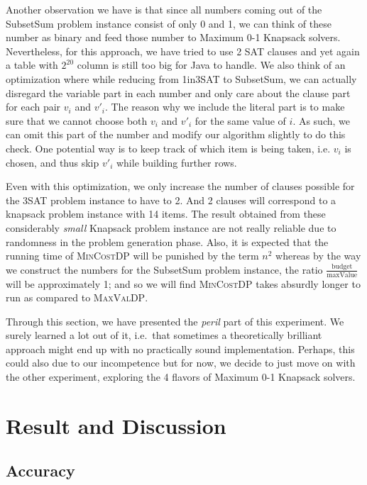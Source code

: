 \documentclass[12pt, oneside]{book}
\begin{document}
Another observation we have is that since all numbers coming out of the
SubsetSum problem instance consist of only 0 and 1, we can think of
these number as binary and feed those number to Maximum 0-1 Knapsack
solvers. Nevertheless, for this approach, we have tried to use 2 SAT
clauses and yet again a table with \(2^{20}\) column is still too big
for Java to handle. We also think of an optimization where while
reducing from 1in3SAT to SubsetSum, we can actually disregard the
variable part in each number and only care about the clause part for
each pair \(v_i\) and \(v'_i\). The reason why we include the literal
part is to make sure that we cannot choose both \(v_i\) and \(v'_i\) for
the same value of \(i\). As such, we can omit this part of the number
and modify our algorithm slightly to do this check. One potential way is
to keep track of which item is being taken, i.e. \(v_i\) is chosen, and
thus skip \(v'_i\) while building further rows.

Even with this optimization, we only increase the number of clauses
possible for the 3SAT problem instance to have to 2. And 2 clauses will
correspond to a knapsack problem instance with 14 items. The result
obtained from these considerably \emph{small} Knapsack problem instance
are not really reliable due to randomness in the problem generation
phase. Also, it is expected that the running time of \textsc{MinCostDP}
will be punished by the term \(n^2\) whereas by the way we construct the
numbers for the SubsetSum problem instance, the ratio
\(\frac{\text{budget}}{\text{maxValue}}\) will be approximately 1; and
so we will find \textsc{MinCostDP} takes absurdly longer to run as
compared to \textsc{MaxValDP}.

Through this section, we have presented the \emph{peril} part of this
experiment. We surely learned a lot out of it, i.e.~that sometimes a
theoretically brilliant approach might end up with no practically sound
implementation. Perhaps, this could also due to our incompetence but for
now, we decide to just move on with the other experiment, exploring the
4 flavors of Maximum 0-1 Knapsack solvers.

\chapter{Result and Discussion}\label{resdis}

\section{Accuracy}\label{accuracy}
\end{document}
